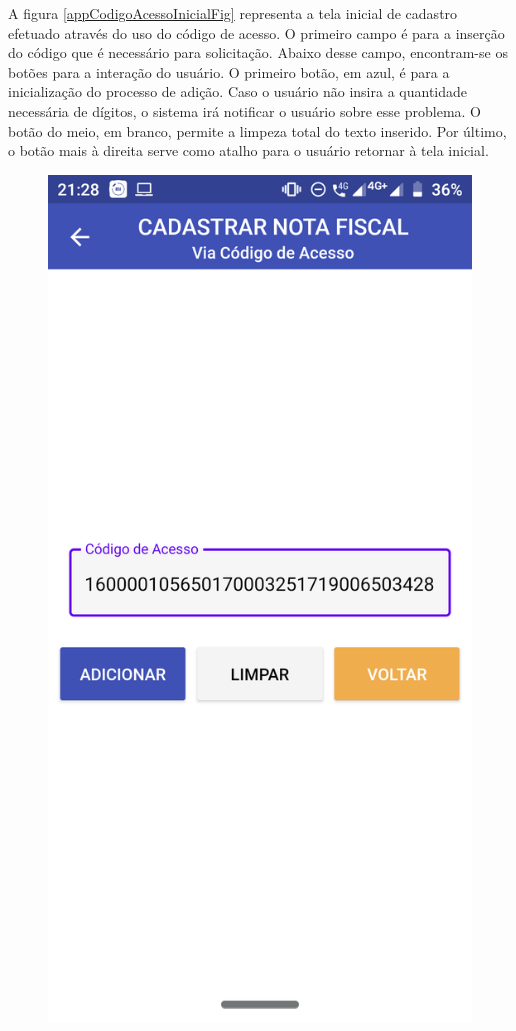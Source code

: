 A figura \ref{appCodigoAcessoInicialFig} representa a tela inicial de cadastro efetuado através do uso do código de acesso. O primeiro campo é para a inserção do código que é necessário para solicitação. Abaixo desse campo, encontram-se os botões para a interação do usuário. O primeiro botão, em azul, é para a inicialização do processo de adição. Caso o usuário não insira a quantidade necessária de dígitos, o sistema irá notificar o usuário sobre esse problema. O botão do meio, em branco, permite a limpeza total do texto inserido. Por último, o botão mais à direita serve como atalho para o usuário retornar à tela inicial.

\newpage
\begin{figure}[h]
    \centering
    \includegraphics[scale=0.15]{tcc/figures/app/app_codigo_acesso_com_codigo.png}

\end{figure}
